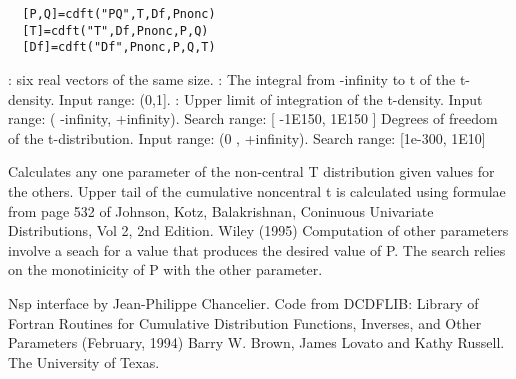 \begin{mandesc}
\end{mandesc}
\label{cdft}
\begin{calling_sequence}
\begin{verbatim}
  [P,Q]=cdft("PQ",T,Df,Pnonc)  
  [T]=cdft("T",Df,Pnonc,P,Q)  
  [Df]=cdft("Df",Pnonc,P,Q,T)  
\end{verbatim}
\end{calling_sequence}
\begin{parameters}
  \begin{varlist}
     : six real vectors of the same size.
     : The integral from -infinity to t of the t-density. Input range: (0,1].
       : Upper limit of integration of the t-density. Input range: ( -infinity, +infinity). Search range: [ -1E150, 1E150 ]
       Degrees of freedom of the t-distribution. Input range: (0 , +infinity). Search range: [1e-300, 1E10]
  \end{varlist}
\end{parameters}
\begin{mandescription}
  Calculates any one parameter of the non-central T distribution given
  values for the others.
  Upper tail    of  the  cumulative  noncentral t is calculated using 
  formulae  from page 532  of Johnson, Kotz,  Balakrishnan, Coninuous 
  Univariate Distributions, Vol 2, 2nd Edition.  Wiley (1995) 
  Computation of other parameters involve a seach for a value that 
  produces  the desired  value  of P.   The search relies  on  the 
  monotinicity of P with the other parameter. 
\end{mandescription}

\begin{authors}
  Nsp interface by Jean-Philippe Chancelier. Code from DCDFLIB: 
  Library of Fortran Routines for Cumulative Distribution
  Functions, Inverses, and Other Parameters (February, 1994)
  Barry W. Brown, James Lovato and Kathy Russell. The University of Texas.
\end{authors}
